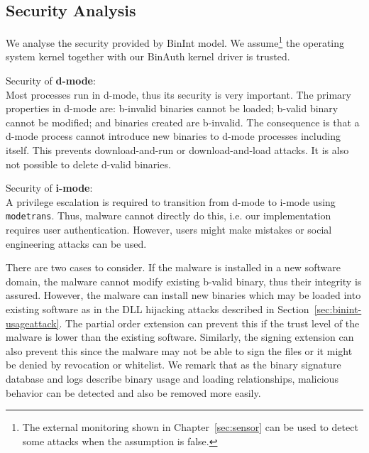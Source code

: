 \subsection{Security Analysis}
\label{sec:binint-secanal}

We analyse the security provided by BinInt model.
We assume\footnote{
The external monitoring shown in Chapter~\ref{sec:sensor}
can be used to detect some attacks when the assumption is false.}
the operating system kernel together with our BinAuth
kernel driver is trusted.

\noindent
Security of {\bf d-mode}: \\
Most processes run in d-mode, thus its security is very
important.
The primary properties in d-mode are: 
b-invalid binaries cannot be loaded; b-valid binary
cannot be modified; and binaries created are b-invalid.
The consequence is that a d-mode process cannot introduce new
binaries to d-mode processes including itself.
This prevents download-and-run or download-and-load attacks.
It is also not possible to delete d-valid binaries.
\medskip

\noindent
Security of {\bf i-mode}: \\
A privilege escalation is required to transition from d-mode to i-mode
using {\tt modetrans}. Thus, malware cannot directly do this, i.e.
our implementation requires user authentication.
However, users might make mistakes or social engineering attacks can
be used.

There are two cases to consider.
If the malware is installed in a new software domain,
the malware cannot modify existing b-valid binary,
thus their integrity is assured.
However, the malware can install new binaries which may be loaded
into existing software as in the DLL hijacking attacks described
in Section~\ref{sec:binint-usageattack}.
The partial order extension can prevent this if the trust level
of the malware is lower than the existing software.
Similarly, the signing extension can also prevent this since the 
malware may not be able to sign the files or it might be denied by
revocation or whitelist.
We remark that as the binary signature database and logs describe
binary usage and loading relationships, malicious behavior can
be detected and also be removed more easily.

